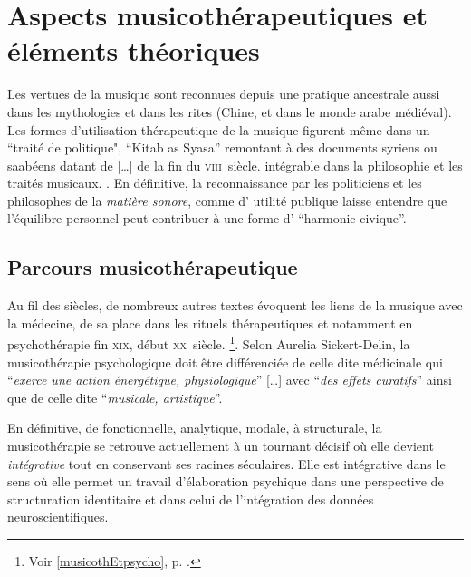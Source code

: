\chapter{Aspects musicothérapeutiques et éléments théoriques}

Les vertues de la musique sont reconnues depuis une pratique
ancestrale aussi 
dans les mythologies et dans les rites (Chine, et dans le monde arabe
médiéval). 
Les formes d'utilisation 
thérapeutique de la musique figurent même dans un ``traité de politique",
``Kitab as Syasa'' remontant à des documents syriens ou saabéens datant de  [\dots] de la fin du 
\textsc{viii}\ieme\ siècle.   intégrable dans la 
philosophie et les traités musicaux. \autocite[ch. III, p. 
96]{vrait_musicotherapie_2018}.
En définitive, la reconnaissance par les  politiciens  et les
philosophes de la \textit{matière sonore}, comme d' utilité
publique laisse entendre que l'équilibre personnel
peut contribuer à une forme d' ``harmonie civique''.

 

\section{Parcours musicothérapeutique}


 Au fil des siècles, de nombreux autres 
textes évoquent les liens de la musique avec la médecine, de sa place dans les 
rituels thérapeutiques et notamment en psychothérapie fin \textsc{xix}\ieme, 
début \textsc{xx}\ieme\ siècle. \footnote{Voir \ref{musicothEtpsycho},
  p. \pageref{musicothEtpsycho}.}.
Selon Aurelia Sickert-Delin, la musicothérapie 
psychologique doit être différenciée de celle dite médicinale qui 
\enquote{\emph{exerce une action 
énergétique, physiologique}} [\dots] avec \enquote{\emph{des effets curatifs}}  
ainsi que de celle dite \enquote{\emph{musicale, artistique}}. 

 En définitive, de fonctionnelle, analytique, mo\-da\-le,  à 
struc\-tu\-rale, la musicothérapie se retrouve actuellement 
 à un tournant décisif où elle devient 
 \emph{intégrative} tout en conservant ses racines séculaires. Elle est 
intégrative dans le sens où elle permet un travail d'élaboration psychique dans une perspective de structuration identitaire \autocite[ch. III, p. 53, 
105]{vrait_musicotherapie_2018} et dans celui de l'intégration des données 
neuroscientifiques.
 
